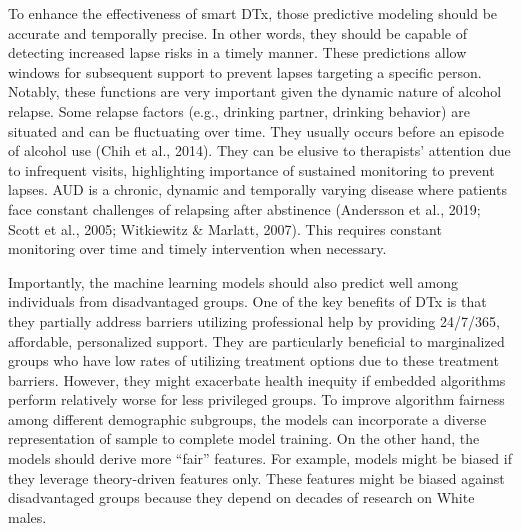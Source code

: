 \documentclass[
  letterpaper,
  DIV=11,
  numbers=noendperiod]{scrartcl}
\begin{document}
To enhance the effectiveness of smart DTx, those predictive modeling
should be accurate and temporally precise. In other words, they should
be capable of detecting increased lapse risks in a timely manner. These
predictions allow windows for subsequent support to prevent lapses
targeting a specific person. Notably, these functions are very important
given the dynamic nature of alcohol relapse. Some relapse factors (e.g.,
drinking partner, drinking behavior) are situated and can be fluctuating
over time. They usually occurs before an episode of alcohol use (Chih et
al., 2014). They can be elusive to therapists' attention due to
infrequent visits, highlighting importance of sustained monitoring to
prevent lapses. AUD is a chronic, dynamic and temporally varying disease
where patients face constant challenges of relapsing after abstinence
(Andersson et al., 2019; Scott et al., 2005; Witkiewitz \& Marlatt,
2007). This requires constant monitoring over time and timely
intervention when necessary.

Importantly, the machine learning models should also predict well among
individuals from disadvantaged groups. One of the key benefits of DTx is
that they partially address barriers utilizing professional help by
providing 24/7/365, affordable, personalized support. They are
particularly beneficial to marginalized groups who have low rates of
utilizing treatment options due to these treatment barriers. However,
they might exacerbate health inequity if embedded algorithms perform
relatively worse for less privileged groups. To improve algorithm
fairness among different demographic subgroups, the models can
incorporate a diverse representation of sample to complete model
training. On the other hand, the models should derive more ``fair''
features. For example, models might be biased if they leverage
theory-driven features only. These features might be biased against
disadvantaged groups because they depend on decades of research on White
males.
\end{document}
